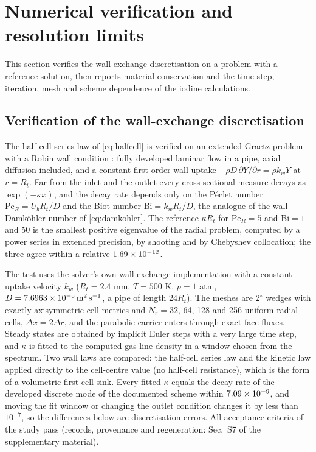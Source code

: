 \section{Numerical verification and resolution limits}
\label{sec:verification}
This section verifies the wall-exchange discretisation on a problem with
a reference solution, then reports material conservation and the
time-step, iteration, mesh and scheme dependence of the iodine
calculations.

\subsection{Verification of the wall-exchange discretisation}
\label{sec:graetz}
The half-cell series law of \cref{eq:halfcell} is verified on an
extended Graetz problem with a Robin wall condition
\cite{Shah1978circular}: fully developed laminar flow in a pipe,
axial diffusion included, and a constant first-order wall uptake
$-\rho D\,\partial Y/\partial r=\rho k_wY$ at $r=R_t$. Far from the inlet
and the outlet every cross-sectional measure decays as
$\exp(-\kappa x)$, and the decay rate depends only on the P\'eclet number
$\mathrm{Pe}_R=U_bR_t/D$ and the Biot number $\mathrm{Bi}=k_wR_t/D$, the
analogue of the wall Damk\"ohler number of \cref{eq:damkohler}. The
reference $\kappa R_t$ for $\mathrm{Pe}_R=5$ and $\mathrm{Bi}=1$ and 50 is the
smallest positive eigenvalue of the radial problem, computed by a power
series in extended precision, by shooting and by Chebyshev
collocation; the three agree within a relative $1.69\times10^{-12}$.

The test uses the solver's own wall-exchange implementation with a
constant uptake velocity $k_w$ ($R_t=2.4$ mm, $T=500$ K, $p=1$ atm,
$D=7.6963\times10^{-5}\,\mathrm{m^2\,s^{-1}}$, a pipe of length $24R_t$). The
meshes are 2$^\circ$ wedges with exactly axisymmetric cell metrics and
$N_r=32$, 64, 128 and 256 uniform radial cells, $\Delta x=2\Delta r$, and
the parabolic carrier enters through exact face fluxes. Steady states
are obtained by implicit Euler steps with a very large time step, and
$\kappa$ is fitted to the computed gas line density in a window chosen from
the spectrum. Two wall laws are compared: the half-cell series law and
the kinetic law applied directly to the cell-centre value (no half-cell
resistance), which is the form of a volumetric first-cell sink. Every
fitted $\kappa$ equals the decay rate of the developed discrete mode of
the documented scheme within $7.09\times10^{-9}$, and moving the fit window or
changing the outlet condition changes it by less than $10^{-7}$, so the
differences below are discretisation errors. All \GraetzCriteria{}
acceptance criteria of the study pass (records, provenance and
regeneration: Sec.~S7 of the supplementary material).

